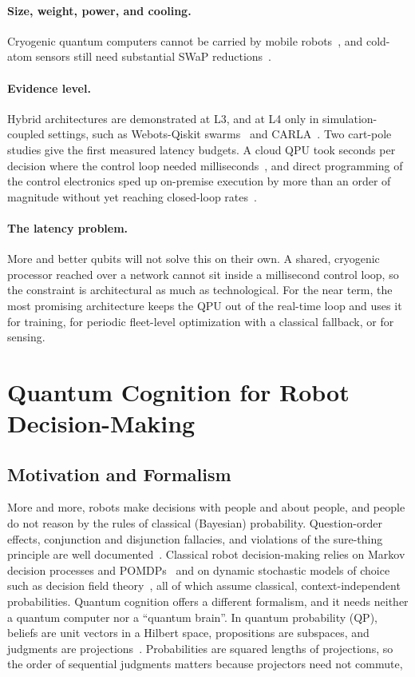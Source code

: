 \documentclass[acmsmall,screen,review]{acmart}
\begin{document}
\paragraph{Size, weight, power, and cooling.} Cryogenic quantum computers cannot be carried by mobile robots~\cite{Kjaergaard2020,Mannone2025}, and cold-atom sensors still need substantial SWaP reductions~\cite{Bongs2019}.

\paragraph{Evidence level.} Hybrid architectures are demonstrated at L3, and at L4 only in simulation-coupled settings, such as Webots-Qiskit swarms~\cite{Mannone2025} and CARLA~\cite{Sinha2023}. Two cart-pole studies give the first measured latency budgets. A cloud QPU took seconds per decision where the control loop needed milliseconds~\cite{Sun2025}, and direct programming of the control electronics sped up on-premise execution by more than an order of magnitude without yet reaching closed-loop rates~\cite{Ngo2026}.

\paragraph{The latency problem.} More and better qubits will not solve this on their own. A shared, cryogenic processor reached over a network cannot sit inside a millisecond control loop, so the constraint is architectural as much as technological. For the near term, the most promising architecture keeps the QPU out of the real-time loop and uses it for training, for periodic fleet-level optimization with a classical fallback, or for sensing.


\section{Quantum Cognition for Robot Decision-Making}\label{sec:cognition}

\subsection{Motivation and Formalism}\label{sec:cog-formalism}
More and more, robots make decisions with people and about people, and people do not reason by the rules of classical (Bayesian) probability. Question-order effects, conjunction and disjunction fallacies, and violations of the sure-thing principle are well documented~\cite{Pothos2013}. Classical robot decision-making relies on Markov decision processes and POMDPs~\cite{Kaelbling1998,Kurniawati2022} and on dynamic stochastic models of choice such as decision field theory~\cite{Busemeyer1993}, all of which assume classical, context-independent probabilities. Quantum cognition offers a different formalism, and it needs neither a quantum computer nor a ``quantum brain''. In quantum probability (QP), beliefs are unit vectors in a Hilbert space, propositions are subspaces, and judgments are projections~\cite{Busemeyer2012}. Probabilities are squared lengths of projections, so the order of sequential judgments matters because projectors need not commute,
\end{document}
